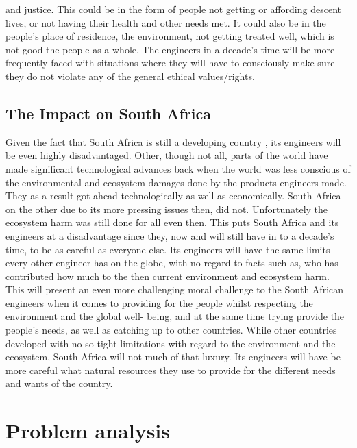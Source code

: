 \documentclass[12pt]{witseiepaper}
\begin{document}
and justice. This could be in the form of people not getting or affording descent lives, or not having their health and other needs met. It could also be in the people’s place of residence, the environment, not getting treated well, which is not good the people as a whole. The engineers in a decade’s time will be more frequently faced with situations where they will have to consciously make sure they do not violate any of the general ethical values/rights. 


	\subsection{The Impact on South Africa} 

	Given the fact that South Africa is still a developing country \cite{bakari2018south}, its engineers will be even highly disadvantaged. Other, though not all, parts of the world have made significant technological advances back when the world was less conscious of the environmental and ecosystem damages done by the products engineers made. They as a result got ahead technologically as well as economically. South Africa on the other due to its more pressing issues then, did not. Unfortunately the ecosystem harm was still done for all even then. This puts South Africa and its engineers at a disadvantage since they, now and will still have in to a decade’s time, to be as careful as everyone else. Its engineers will have the same limits every other engineer has on the globe, with no regard to facts such as, who has contributed how much to the then current environment and ecosystem harm. This will present an even more challenging moral challenge to the South African engineers when it comes to providing for the people whilst respecting the environment and the global well- being, and at the same time trying provide the people’s needs, as well as catching up to other countries. While other countries developed with no so tight limitations with regard to the environment and the ecosystem, South Africa will not much of that luxury. Its engineers will have be more careful what natural resources they use to provide for the different needs and wants of the country. 


\section{Problem analysis}
\end{document}
